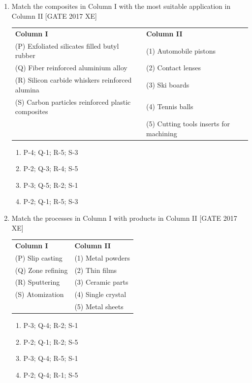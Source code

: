 \documentclass[journal,12pt,onecolumn]{IEEEtran}
\theoremstyle{remark}
\begin{document}
\begin{enumerate}
\item Match the composites in Column I with the most suitable application in Column II  
\hfill [GATE 2017 XE]

\begin{tabular}{ll}
\textbf{Column I} & \textbf{Column II} \\
(P) Exfoliated silicates filled butyl rubber & (1) Automobile pistons \\
(Q) Fiber reinforced aluminium alloy & (2) Contact lenses \\
(R) Silicon carbide whiskers reinforced alumina & (3) Ski boards \\
(S) Carbon particles reinforced plastic composites & (4) Tennis balls \\
& (5) Cutting tools inserts for machining \\
\end{tabular}

\begin{multicols}{2}
\begin{enumerate}
    \item P-4; Q-1; R-5; S-3
    \item P-2; Q-3; R-4; S-5
    \item P-3; Q-5; R-2; S-1
    \item P-2; Q-1; R-5; S-3
\end{enumerate}
\end{multicols}


\item Match the processes in Column I with products in Column II  
\hfill [GATE 2017 XE]

\begin{tabular}{ll}
\textbf{Column I} & \textbf{Column II} \\
(P) Slip casting & (1) Metal powders \\
(Q) Zone refining & (2) Thin films \\
(R) Sputtering & (3) Ceramic parts \\
(S) Atomization & (4) Single crystal \\
& (5) Metal sheets \\
\end{tabular}

\begin{multicols}{2}
\begin{enumerate}
    \item P-3; Q-4; R-2; S-1
    \item P-2; Q-1; R-2; S-5
    \item P-3; Q-4; R-5; S-1
    \item P-2; Q-4; R-1; S-5
\end{enumerate}
\end{multicols}


\end{enumerate}
\end{document}
